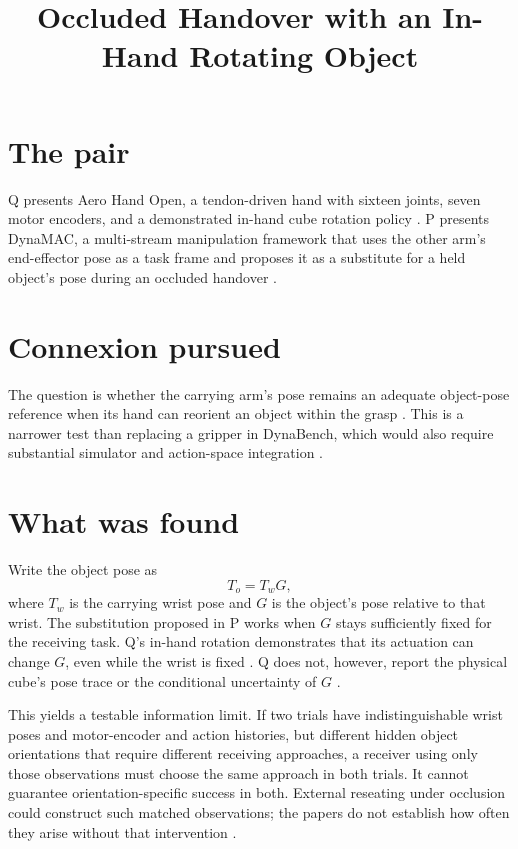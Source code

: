 \documentclass{article}
\title{Occluded Handover with an In-Hand Rotating Object}
\begin{document}
\maketitle

\section*{The pair}
Q presents Aero Hand Open, a tendon-driven hand with sixteen joints, seven motor encoders, and a demonstrated in-hand cube rotation policy . P presents DynaMAC, a multi-stream manipulation framework that uses the other arm's end-effector pose as a task frame and proposes it as a substitute for a held object's pose during an occluded handover .

\section*{Connexion pursued}
The question is whether the carrying arm's pose remains an adequate object-pose reference when its hand can reorient an object within the grasp . This is a narrower test than replacing a gripper in DynaBench, which would also require substantial simulator and action-space integration .

\section*{What was found}
Write the object pose as
\[
T_o = T_w G,
\]
where \(T_w\) is the carrying wrist pose and \(G\) is the object's pose relative to that wrist. The substitution proposed in P works when \(G\) stays sufficiently fixed for the receiving task. Q's in-hand rotation demonstrates that its actuation can change \(G\), even while the wrist is fixed . Q does not, however, report the physical cube's pose trace or the conditional uncertainty of \(G\) .

This yields a testable information limit. If two trials have indistinguishable wrist poses and motor-encoder and action histories, but different hidden object orientations that require different receiving approaches, a receiver using only those observations must choose the same approach in both trials. It cannot guarantee orientation-specific success in both. External reseating under occlusion could construct such matched observations; the papers do not establish how often they arise without that intervention .
\end{document}
